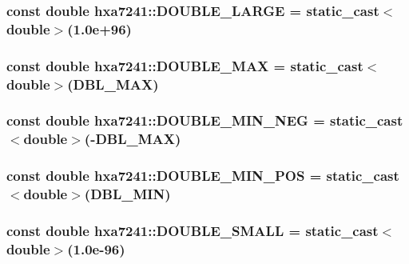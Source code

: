 \subsubsection{\setlength{\rightskip}{0pt plus 5cm}const double {\bf hxa7241::DOUBLE\_\-LARGE} = static\_\-cast$<$double$>$(1.0e+96)}\label{namespacehxa7241_c5793cdbd6528204aa1941c431f054ba}


\subsubsection{\setlength{\rightskip}{0pt plus 5cm}const double {\bf hxa7241::DOUBLE\_\-MAX} = static\_\-cast$<$double$>$(DBL\_\-MAX)}\label{namespacehxa7241_c96d6f5b1b2d6308f9641677c6f070fc}


\subsubsection{\setlength{\rightskip}{0pt plus 5cm}const double {\bf hxa7241::DOUBLE\_\-MIN\_\-NEG} = static\_\-cast$<$double$>$(-DBL\_\-MAX)}\label{namespacehxa7241_a9629489df8ef535266f11220c0744a8}


\subsubsection{\setlength{\rightskip}{0pt plus 5cm}const double {\bf hxa7241::DOUBLE\_\-MIN\_\-POS} = static\_\-cast$<$double$>$(DBL\_\-MIN)}\label{namespacehxa7241_4346063ac57e1eca8b123fc5d74bda60}


\subsubsection{\setlength{\rightskip}{0pt plus 5cm}const double {\bf hxa7241::DOUBLE\_\-SMALL} = static\_\-cast$<$double$>$(1.0e-96)}\label{namespacehxa7241_82624246707fba349d1d4128e2165da2}


